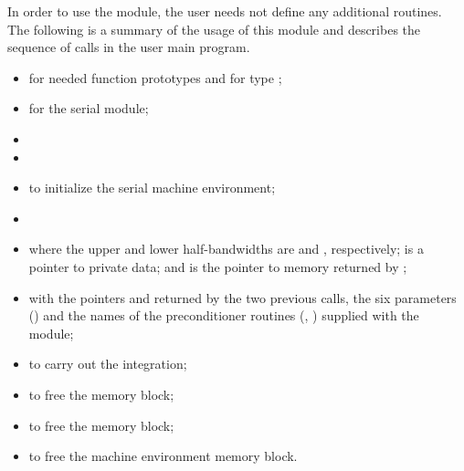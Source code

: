 In order to use the {\cvbandpre} module, the user needs not define any
additional routines. The following is a summary of the usage of this 
module and describes the sequence of calls in the user main program.
\begin{itemize}
  \item {} 
    for needed function prototypes and for type ;

  \item {} 
    for the serial {\nvector} module;

  \item {}

  \item {}

  \item {} 
    to initialize the serial machine environment;

  \item {}

  \item {}

    where the upper and lower half-bandwidths are  and ,
    respectively;  is a pointer to private data; and 
    is the pointer to {\cvode} memory returned by ;
    
  \item {}
    \newline\hspace*{1in}
    \newline\hspace*{1in}

    with the pointers  and  returned by the two previous calls, 
    the six {\spgmr} parameters () and 
    the names of the preconditioner routines (, ) supplied 
    with the {\cvbandpre} module;

  \item {}
    to carry out the integration;

  \item {}
        to free the {\cvbandpre} memory block;

  \item  {} 
    to free the {\cvode} memory block;

  \item {}
    to free the machine environment memory block.

\end{itemize}
